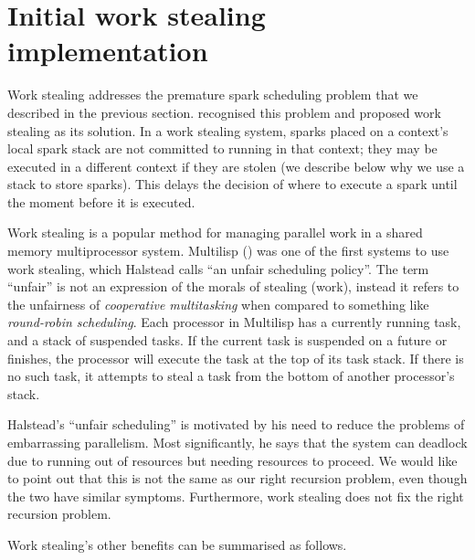 
\section{Initial work stealing implementation}
\label{sec:rts_work_stealing}

Work stealing addresses the premature spark scheduling problem that we
described in the previous section.
\citet{wang:2006:hons} recognised this problem and proposed work stealing as
its solution.
In a work stealing system,
sparks placed on a context's local spark stack
are not committed to running in that context;
they may be executed in a different context if they are stolen
(we describe below why we use a stack to store sparks).
This delays the decision of where to execute a spark until the moment
before it is executed.

Work stealing is a popular method for managing parallel work in a shared
memory multiprocessor system.
Multilisp (\citet{halstead:1985:multilisp}) was one of the first systems to
use work stealing,
which Halstead calls ``an unfair scheduling policy''.
The term ``unfair'' is not an expression of the morals of stealing (work),
instead it refers to the unfairness of \emph{cooperative multitasking} when
compared to something like \emph{round-robin scheduling}.
Each processor in Multilisp has a currently running task,
and a stack of suspended tasks.
If the current task is suspended on a future or finishes,
the processor will execute the task at the top of its task stack.
If there is no such task,
it attempts to steal a task from the bottom of another processor's stack.

Halstead's ``unfair scheduling'' is motivated by his need to reduce the
problems of embarrassing parallelism.
Most significantly,
he says that the system can deadlock due to running out of resources but
needing resources to proceed.
We would like to point out that
this is not the same as our right recursion problem,
even though the two have similar symptoms.
Furthermore,
work stealing does not fix the right recursion problem.

Work stealing's other benefits can be summarised as follows.

